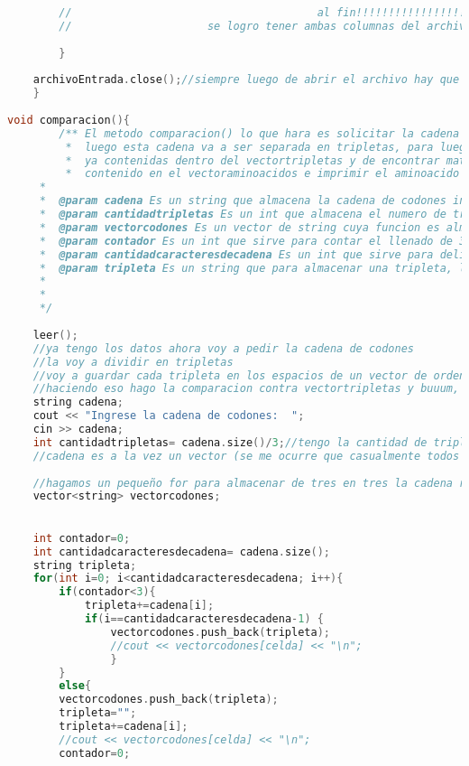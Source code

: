 \documentclass[12pt,letterpaper]{report}
\begin{document}
\begin{lstlisting}[language=c++]
		
		//                                      al fin!!!!!!!!!!!!!!!!!!!!!!!!!!!
		//                     se logro tener ambas columnas del archivo en 2 vectores independientes
		
		}
		
	archivoEntrada.close();//siempre luego de abrir el archivo hay que cerrarlo
	}
	
void comparacion(){
		/** El metodo comparacion() lo que hara es solicitar la cadena de codones de codigo genetico al usuario
		 *  luego esta cadena va a ser separada en tripletas, para luego compararlas respecto a las tripletas 
		 *  ya contenidas dentro del vectortripletas y de encontrar match asociar el correspondiente aminoacido,
		 *  contenido en el vectoraminoacidos e imprimir el aminoacido asociado a la cantidad de tripletas existentes.
	 * 
	 *  @param cadena Es un string que almacena la cadena de codones ingresada por el usuario.
	 *  @param cantidadtripletas Es un int que almacena el numero de tripletas que la cadena contiene.
	 *  @param vectorcodones Es un vector de string cuya funcion es almacena en tripletas la cadena ingresada
	 *  @param contador Es un int que sirve para contar el llenado de 3 caracteres, luego se reinicia para contar otros 3 caracteres y asi hasta recorrer la cadena.
	 *  @param cantidadcaracteresdecadena Es un int que sirve para delimitar el for, saber hasta donde recorro la cadena ingresada
	 *  @param tripleta Es un string que para almacenar una tripleta, luego es reescrita para contener otra tripleta y asi sucesivamente hasta ser rellenada por la ultima tripleta
	 * 
	 * 
	 */
	 
	leer();
	//ya tengo los datos ahora voy a pedir la cadena de codones
	//la voy a dividir en tripletas
	//voy a guardar cada tripleta en los espacios de un vector de orden n, donde n va a ser la cantidad de tripletas que tiene la cadena de codones ingresada
	//haciendo eso hago la comparacion contra vectortripletas y buuum, relaciono el equivalente segun el vectoraminoacidos
	string cadena;
	cout << "Ingrese la cadena de codones:  "; 
    cin >> cadena; 
    int cantidadtripletas= cadena.size()/3;//tengo la cantidad de tripletas para esa cadena de codones
    //cadena es a la vez un vector (se me ocurre que casualmente todos los strings los puedo manipular como vectores)
    
    //hagamos un pequeño for para almacenar de tres en tres la cadena recibida
    vector<string> vectorcodones;

  
    int contador=0;
    int cantidadcaracteresdecadena= cadena.size();
    string tripleta;
    for(int i=0; i<cantidadcaracteresdecadena; i++){
		if(contador<3){
		    tripleta+=cadena[i];
            if(i==cantidadcaracteresdecadena-1) {
				vectorcodones.push_back(tripleta);
				//cout << vectorcodones[celda] << "\n";
				}
	    }
	    else{
		vectorcodones.push_back(tripleta);
		tripleta="";
		tripleta+=cadena[i];
		//cout << vectorcodones[celda] << "\n"; 
		contador=0;
		

\end{lstlisting}
\end{document}
